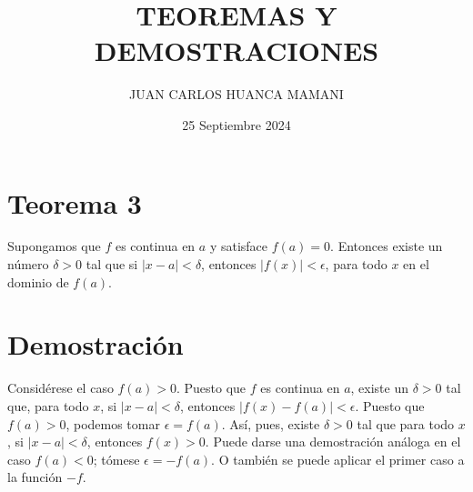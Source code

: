 \documentclass{article}
\title{TEOREMAS Y DEMOSTRACIONES}
\author{JUAN CARLOS HUANCA MAMANI}
\date{25 Septiembre 2024}
\begin{document}
\maketitle

\section*{Teorema 3}
Supongamos que \( f \) es continua en \( a \) y satisface \( f(a) = 0 \). Entonces existe un número \( \delta > 0 \) tal que si \( |x - a| < \delta \), entonces \( |f(x)| < \epsilon \), para todo \( x \) en el dominio de \( f(a) \).

\section*{Demostración}
Considérese el caso \( f(a) > 0 \). Puesto que \( f \) es continua en \( a \), existe un \( \delta > 0 \) tal que, para todo \( x \), si \( |x - a| < \delta \), entonces \( |f(x) - f(a)| < \epsilon \). Puesto que \( f(a) > 0 \), podemos tomar \( \epsilon = f(a) \). Así, pues, existe \( \delta > 0 \) tal que para todo \( x \), si \( |x - a| < \delta \), entonces \( f(x) > 0 \). Puede darse una demostración análoga en el caso \( f(a) < 0 \); tómese \( \epsilon = -f(a) \). O también se puede aplicar el primer caso a la función \( -f \).
\end{document}
